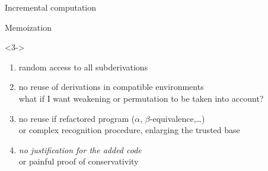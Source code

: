 \documentclass{beamer}
\theoremstyle{example}
\begin{document}
\begin{frame}[fragile]{Incremental computation}
\begin{block}{Memoization}
\begin{overlayarea}{\textwidth}{.7\textheight}
    \begin{onlyenv}<3->
      \begin{enumerate}
      \item<3->[\itplus] random access to all subderivations
      \item<4->[\itminus] no reuse of derivations in compatible
        environments \\
        {\footnotesize what if I want \eg weakening or
          permutation to be taken into account?}
      \item<5->[\itminus] no reuse if refactored program ($\alpha$,
        $\beta$-equivalence,\ldots) \\
        {\footnotesize or complex recognition procedure, enlarging the
          trusted base}
      \item<6->[\itminus] {\large\it no justification for the added code} \\
        {\footnotesize or painful proof of conservativity}
      \end{enumerate}

    \end{onlyenv}
    \end{overlayarea}
\end{block}
\end{frame}

\end{document}
